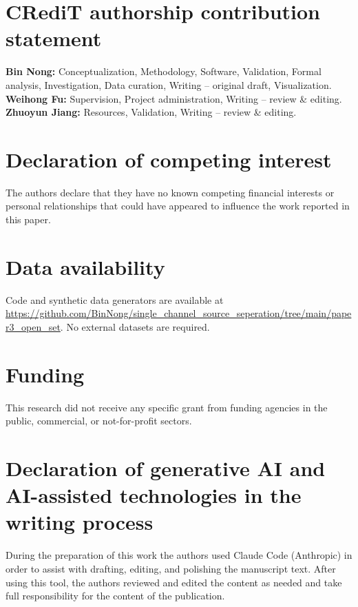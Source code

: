 \documentclass[review,12pt]{elsarticle}
\begin{document}
\section*{CRediT authorship contribution statement}
\textbf{Bin Nong:} Conceptualization, Methodology, Software, Validation,
Formal analysis, Investigation, Data curation, Writing -- original
draft, Visualization.
\textbf{Weihong Fu:} Supervision, Project administration, Writing --
review \& editing.
\textbf{Zhuoyun Jiang:} Resources, Validation, Writing -- review \&
editing.

\section*{Declaration of competing interest}
The authors declare that they have no known competing financial
interests or personal relationships that could have appeared to
influence the work reported in this paper.

\section*{Data availability}
Code and synthetic data generators are available at
\url{https://github.com/BinNong/single_channel_source_seperation/tree/main/paper3_open_set}.
No external datasets are required.

\section*{Funding}
This research did not receive any specific grant from funding agencies
in the public, commercial, or not-for-profit sectors.

\section*{Declaration of generative AI and AI-assisted technologies in the writing process}
During the preparation of this work the authors used Claude Code
(Anthropic) in order to assist with drafting, editing, and polishing the
manuscript text. After using this tool, the authors reviewed and edited
the content as needed and take full responsibility for the content of
the publication.
\end{document}
